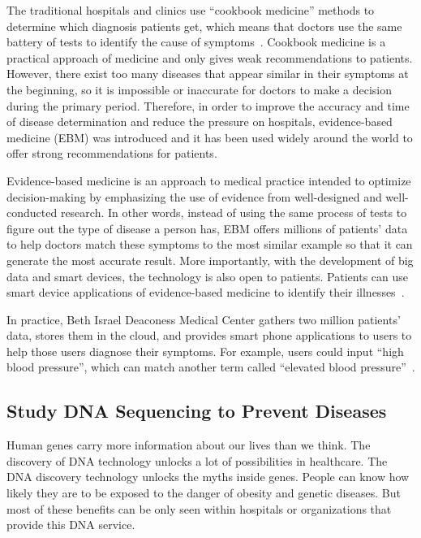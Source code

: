 The traditional hospitals and clinics use ``cookbook medicine'' 
methods to determine which diagnosis patients get, 
which means that doctors use 
the same battery of tests to identify the cause of symptoms~\cite{46}. 
Cookbook medicine
 is a practical approach of medicine and only gives 
 weak recommendations 
 to patients. 
 However, there exist too many diseases that 
 appear similar in their 
 symptoms at the beginning, so it is impossible or inaccurate 
 for doctors to make a 
 decision during the primary period. Therefore, in order to 
 improve the accuracy and time of disease 
 determination and reduce 
 the pressure on hospitals, evidence-based 
 medicine (EBM) was 
 introduced and it has been used widely around 
 the world to offer 
 strong recommendations for patients.
 
Evidence-based medicine is an approach to medical 
practice intended 
to optimize decision-making by emphasizing the use 
of evidence from 
well-designed and well-conducted research. 
In other words, instead 
of using the same process of tests to figure out 
the type of disease 
a person has, 
EBM offers millions of patients' data to help doctors 
match these 
symptoms to the most similar example so that it can 
generate the most accurate result. 
More importantly, with the 
development of big data and smart devices, the 
technology is also 
open to patients. Patients can use smart device 
applications
 of evidence-based medicine to identify their 
 illnesses~\cite{Masic2008}.

In practice, Beth Israel Deaconess Medical Center gathers two million 
patients' 
data, stores them in the cloud, and provides smart 
phone applications 
to users to help those users diagnose their symptoms. 
For example, users 
could input ``high blood pressure'', which can match 
another term 
called ``elevated blood pressure''~\cite{46}.

\subsection{Study DNA Sequencing to Prevent Diseases}
Human genes carry more information about 
our lives than we think. 
The discovery 
of DNA technology unlocks a lot of possibilities 
in healthcare. The DNA 
discovery technology unlocks the myths inside genes. 
People can know how 
likely they are to be exposed to the danger of obesity 
and genetic 
diseases. But most 
of these benefits can be only seen within hospitals 
or organizations 
that provide 
this DNA service. 

